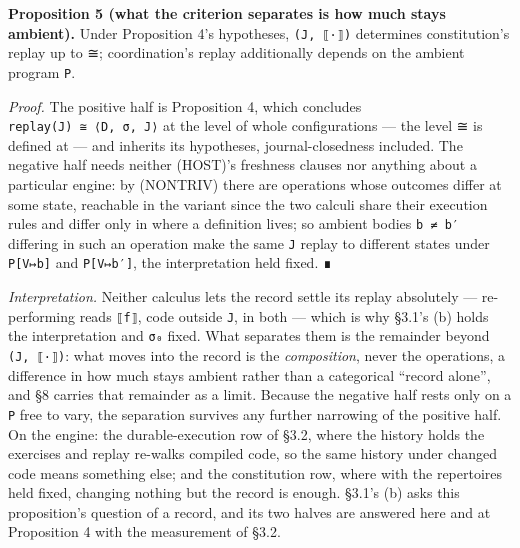 \documentclass[
]{article}
\begin{document}
\textbf{Proposition 5 (what the criterion separates is how much stays
ambient).} Under Proposition 4's hypotheses, \texttt{(J,\ ⟦·⟧)}
determines constitution's replay up to ≅; coordination's replay
additionally depends on the ambient program \texttt{P}.

\emph{Proof.} The positive half is Proposition 4, which concludes
\texttt{replay(J)\ ≅\ ⟨D,\ σ,\ J⟩} at the level of whole configurations
--- the level ≅ is defined at --- and inherits its hypotheses,
journal-closedness included. The negative half needs neither (HOST)'s
freshness clauses nor anything about a particular engine: by (NONTRIV)
there are operations whose outcomes differ at some state, reachable in
the variant since the two calculi share their execution rules and differ
only in where a definition lives; so ambient bodies \texttt{b\ ≠\ b′}
differing in such an operation make the same \texttt{J} replay to
different states under \texttt{P{[}V↦b{]}} and \texttt{P{[}V↦b′{]}}, the
interpretation held fixed. ∎

\emph{Interpretation.} Neither calculus lets the record settle its
replay absolutely --- re-performing reads \texttt{⟦f⟧}, code outside
\texttt{J}, in both --- which is why §3.1's (b) holds the interpretation
and \texttt{σ₀} fixed. What separates them is the remainder beyond
\texttt{(J,\ ⟦·⟧)}: what moves into the record is the
\emph{composition}, never the operations, a difference in how much stays
ambient rather than a categorical ``record alone'', and §8 carries that
remainder as a limit. Because the negative half rests only on a
\texttt{P} free to vary, the separation survives any further narrowing
of the positive half. On the engine: the durable-execution row of §3.2,
where the history holds the exercises and replay re-walks compiled code,
so the same history under changed code means something else; and the
constitution row, where with the repertoires held fixed, changing
nothing but the record is enough. §3.1's (b) asks this proposition's
question of a record, and its two halves are answered here and at
Proposition 4 with the measurement of §3.2.
\end{document}
